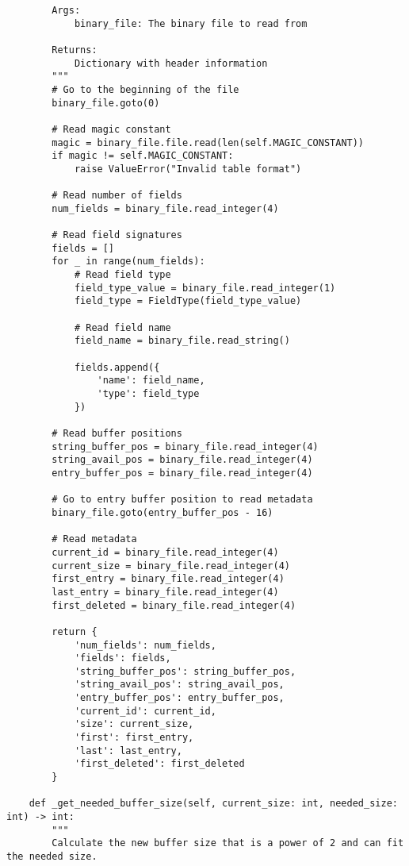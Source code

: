 \documentclass[utf8]{article}
\begin{document}
\begin{verbatim}
        Args:
            binary_file: The binary file to read from
        
        Returns:
            Dictionary with header information
        """
        # Go to the beginning of the file
        binary_file.goto(0)
        
        # Read magic constant
        magic = binary_file.file.read(len(self.MAGIC_CONSTANT))
        if magic != self.MAGIC_CONSTANT:
            raise ValueError("Invalid table format")
        
        # Read number of fields
        num_fields = binary_file.read_integer(4)
        
        # Read field signatures
        fields = []
        for _ in range(num_fields):
            # Read field type
            field_type_value = binary_file.read_integer(1)
            field_type = FieldType(field_type_value)
            
            # Read field name
            field_name = binary_file.read_string()
            
            fields.append({
                'name': field_name,
                'type': field_type
            })
        
        # Read buffer positions
        string_buffer_pos = binary_file.read_integer(4)
        string_avail_pos = binary_file.read_integer(4)
        entry_buffer_pos = binary_file.read_integer(4)
        
        # Go to entry buffer position to read metadata
        binary_file.goto(entry_buffer_pos - 16)
        
        # Read metadata
        current_id = binary_file.read_integer(4)
        current_size = binary_file.read_integer(4)
        first_entry = binary_file.read_integer(4)
        last_entry = binary_file.read_integer(4)
        first_deleted = binary_file.read_integer(4)
        
        return {
            'num_fields': num_fields,
            'fields': fields,
            'string_buffer_pos': string_buffer_pos,
            'string_avail_pos': string_avail_pos,
            'entry_buffer_pos': entry_buffer_pos,
            'current_id': current_id,
            'size': current_size,
            'first': first_entry,
            'last': last_entry,
            'first_deleted': first_deleted
        }
    
    def _get_needed_buffer_size(self, current_size: int, needed_size: int) -> int:
        """
        Calculate the new buffer size that is a power of 2 and can fit the needed size.
        

\end{verbatim}
\end{document}
